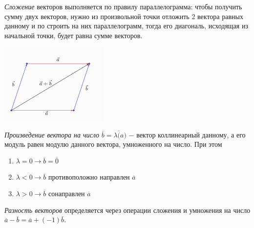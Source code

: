 \begin{definition}
	\textit{Сложение} векторов выполняется по правилу параллелограмма: чтобы получить сумму двух векторов, нужно из произвольной точки отложить 2 вектора равных данному и по строить на них параллелограмм, тогда его диагональ, исходящая из начальной точки, будет равна сумме векторов.
\end{definition}

\begin{center}
	\includegraphics[width=0.4\textwidth]{images/pravilo_parallelogramma.png}
\end{center}

\begin{definition}
	\textit{Произведение вектора на число} $\overline{b} = \lambda\overline(a)$ $-$ вектор коллинеарный данному, а его модуль равен модулю данного вектора, умноженного на число. При этом
	\begin{enumerate}
		\item $\lambda = 0 \longrightarrow \overline{b} = \overline{0}$
		\item $\lambda < 0 \longrightarrow \overline{b}$ противоположно направлен $\overline{a}$
		\item $\lambda > 0 \longrightarrow \overline{b}$ сонаправлен $\overline{a}$
	\end{enumerate}
\end{definition}

\begin{definition}
	\textit{Разность векторов} определяется через операции сложения и умножения на число $\overline{a} - \overline{b} = \overline{a} + (-1)\overline{b}$.
\end{definition}

